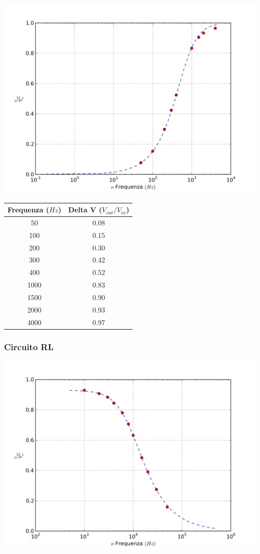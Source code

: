 \begin{center}
 \includegraphics[scale=0.70]{grafici/C3/ddpcond.png}
\end{center}

\begin{center}
\begin{tabular}{*{2}{c}}
Frequenza ($Hz$) & Delta V ($V_{out}/V_{in}$) \\
\midrule
50 & 0.08 \\
100 & 0.15 \\
200 & 0.30 \\
300 & 0.42 \\
400 & 0.52 \\
1000 & 0.83 \\
1500 & 0.90 \\
2000 & 0.93 \\
4000 & 0.97 \\
\end{tabular}
\end{center}


\subsubsection{Circuito RL}

\begin{center}
 \includegraphics[scale=0.70]{grafici/C3/ddpindu.png}
\end{center}

